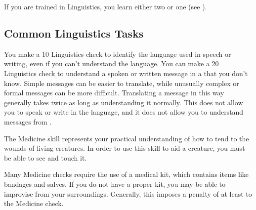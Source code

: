         If you are trained in Linguistics, you learn either two  or one  (see ).

    \subsection{Common Linguistics Tasks}

         You make a  10 Linguistics check to identify the language used in speech or writing, even if you can't understand the language.
         You can make a  20 Linguistics check to understand a spoken or written message in a  that you don't know.
        Simple messages can be easier to translate, while unusually complex or formal messages can be more difficult.
        Translating a message in this way generally takes twice as long as understanding it normally.
        This does not allow you to speak or write in the language, and it does not allow you to understand messages from .

\newpage
{}
    The Medicine skill represents your practical understanding of how to tend to the wounds of living creatures.
    In order to use this skill to aid a creature, you must be able to see and touch it.

    Many Medicine checks require the use of a medical kit, which contains items like bandages and salves.
    If you do not have a proper kit, you may be able to improvise from your surroundings.
    Generally, this imposes a penalty of at least  to the Medicine check.

